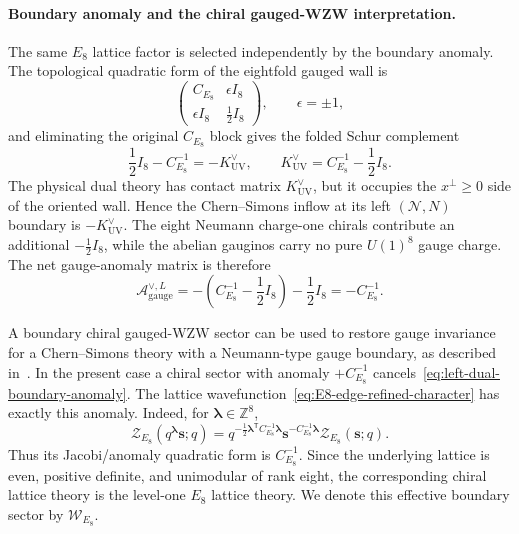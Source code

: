 \documentclass[11pt,a4paper]{article}
\numberwithin{equation}{section}
\begin{document}
\paragraph{Boundary anomaly and the chiral gauged-WZW interpretation.}
The same $E_8$ lattice factor is selected independently by the boundary anomaly.  The topological quadratic form of the eightfold gauged wall is
\begin{equation}
  \begin{pmatrix}
    C_{E_8} & \epsilon I_8\\
    \epsilon I_8 & \frac12 I_8
  \end{pmatrix},
  \qquad \epsilon=\pm1,
  \label{eq:boundary-wall-folded-matrix}
\end{equation}
and eliminating the original $C_{E_8}$ block gives the folded Schur complement
\begin{equation}
  \frac12 I_8-C_{E_8}^{-1}
  =-K_{\mathrm{UV}}^\vee,
  \qquad
  K_{\mathrm{UV}}^\vee=C_{E_8}^{-1}-\frac12 I_8.
  \label{eq:boundary-wall-Schur-complement}
\end{equation}
The physical dual theory has contact matrix $K_{\mathrm{UV}}^\vee$, but it occupies the $x^\perp\geq0$ side of the oriented wall.  Hence the Chern--Simons inflow at its left $(\mathcal N,N)$ boundary is $-K_{\mathrm{UV}}^\vee$.  The eight Neumann charge-one chirals contribute an additional $-\frac12 I_8$, while the abelian gauginos carry no pure $U(1)^8$ gauge charge.  The net gauge-anomaly matrix is therefore
\begin{equation}
  \mathcal A_{\mathrm{gauge}}^{\vee,L}
  =-
  \left(C_{E_8}^{-1}-\frac12 I_8\right)
  -\frac12 I_8
  =-C_{E_8}^{-1}.
  \label{eq:left-dual-boundary-anomaly}
\end{equation}

A boundary chiral gauged-WZW sector can be used to restore gauge invariance for a Chern--Simons theory with a Neumann-type gauge boundary, as described in~\cite{YoshidaSugiyama:2014S1D2}.  In the present case a chiral sector with anomaly $+C_{E_8}^{-1}$ cancels~\eqref{eq:left-dual-boundary-anomaly}.  The lattice wavefunction~\eqref{eq:E8-edge-refined-character} has exactly this anomaly.  Indeed, for $\boldsymbol\lambda\in\mathbb Z^8$,
\begin{equation}
  \mathcal Z_{E_8}(q^{\boldsymbol\lambda}\boldsymbol s;q)
  =
  q^{-\frac12\boldsymbol\lambda^{\mathsf T}C_{E_8}^{-1}\boldsymbol\lambda}
  \boldsymbol s^{-C_{E_8}^{-1}\boldsymbol\lambda}
  \mathcal Z_{E_8}(\boldsymbol s;q).
  \label{eq:E8-edge-quasiperiodicity}
\end{equation}
Thus its Jacobi/anomaly quadratic form is $C_{E_8}^{-1}$.  Since the underlying lattice is even, positive definite, and unimodular of rank eight, the corresponding chiral lattice theory is the level-one $E_8$ lattice theory.  We denote this effective boundary sector by $\mathcal W_{E_8}$.
\end{document}
